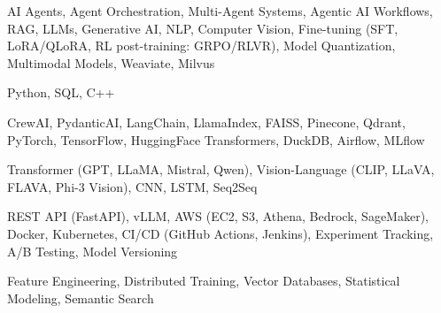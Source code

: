 \documentclass[letter,10pt]{article}
\begin{document}
 AI Agents, Agent Orchestration, Multi-Agent Systems, Agentic AI Workflows, RAG, LLMs, Generative AI, NLP, Computer Vision, Fine-tuning (SFT, LoRA/QLoRA, RL post-training: GRPO/RLVR), Model Quantization, Multimodal Models, Weaviate, Milvus\par\vspace{2pt}

 Python, SQL, C++\par\vspace{2pt}

 CrewAI, PydanticAI, LangChain, LlamaIndex, FAISS, Pinecone, Qdrant, PyTorch, TensorFlow, HuggingFace Transformers, DuckDB, Airflow, MLflow\par\vspace{2pt}

 Transformer (GPT, LLaMA, Mistral, Qwen), Vision-Language (CLIP, LLaVA, FLAVA, Phi-3 Vision), CNN, LSTM, Seq2Seq\par\vspace{2pt}

 REST API (FastAPI), vLLM, AWS (EC2, S3, Athena, Bedrock, SageMaker), Docker, Kubernetes, CI/CD (GitHub Actions, Jenkins), Experiment Tracking, A/B Testing, Model Versioning\par\vspace{2pt}

 Feature Engineering, Distributed Training, Vector Databases, Statistical Modeling, Semantic Search
\end{document}
